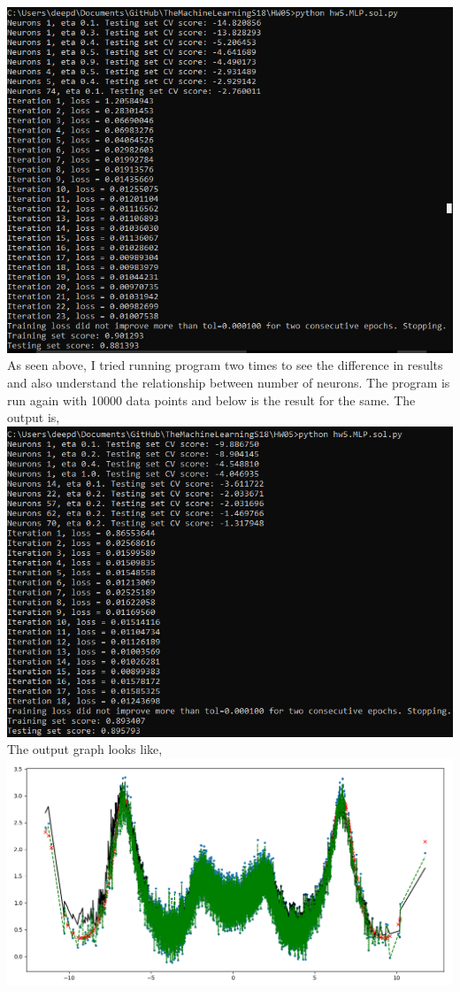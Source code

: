 \documentclass[10pt]{article}         %
\begin{document}
\includegraphics[scale=0.55]{hw51k_n74.PNG}
As seen above, I tried running program two times to see the difference in results and also understand the relationship between number of neurons.
The program is run again with 10000 data points and below is the result for the same.
The output is,
\\\includegraphics[scale=0.75]{hw5q2d.PNG}
The output graph looks like,
\\\includegraphics[scale=0.45]{hw5q2d1.PNG}
\end{document}
